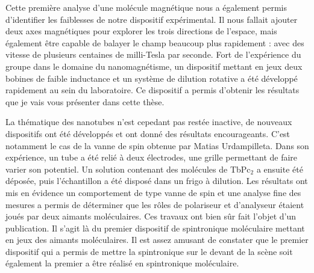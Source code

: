 Cette première analyse d'une molécule magnétique nous a également permis d'identifier les faiblesses de notre dispositif expérimental. Il nous fallait ajouter deux axes magnétiques pour explorer les trois directions de l'espace, mais également être capable de balayer le champ beaucoup plus rapidement : avec des vitesse de plusieurs centaines de milli-Tesla par seconde. Fort de l'expérience du groupe dans le domaine du nanomagnétisme, un dispositif mettant en jeux deux bobines de faible inductance et un système de dilution rotative a été développé rapidement au sein du laboratoire. Ce dispositif a permis d'obtenir les résultats que je vais vous présenter dans cette thèse.

La thématique des nanotubes n'est cepedant pas restée inactive, de nouveaux dispositifs ont été développés et ont donné des résultats encourageants. C'est notamment le cas de la vanne de spin obtenue par Matias Urdampilleta. Dans son expérience, un tube a été relié à deux électrodes, une grille permettant de faire varier son potentiel. Un solution contenant des molécules de TbPc$_{2}$ a ensuite été déposée, puis l'échantillon a été disposé dans un frigo à dilution. Les résultats ont mis en évidence un comportement de type vanne de spin et une analyse fine des mesures a permis de déterminer que les rôles de polariseur et d'analyseur étaient joués par deux aimants moléculaires. Ces travaux ont bien sûr fait l'objet d'un publication. Il s'agit là du premier dispositif de spintronique moléculaire mettant en jeux des aimants moléculaires. Il est assez amusant de constater que le premier dispositif qui a permis de mettre la spintronique sur le devant de la scène soit également la premier a être réalisé en spintronique moléculaire.